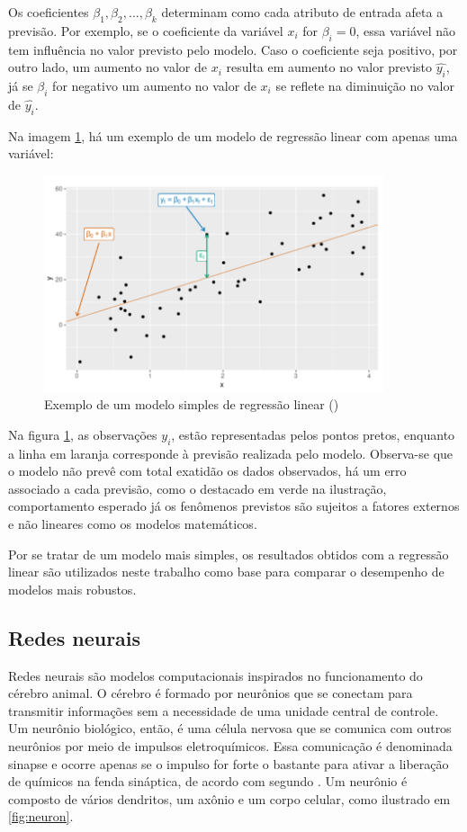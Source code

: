 Os coeficientes $\beta_1, \beta_2, \dots, \beta_k$ 
determinam como cada atributo de entrada afeta a previsão.
Por exemplo, se o coeficiente da variável $x_i$ for $\beta_i = 0$,
essa variável não tem influência no valor previsto pelo modelo. 
Caso o coeficiente seja positivo, por outro lado, um aumento 
no valor de $x_i$ resulta em aumento no valor previsto $\hat{y_i}$,
já se $\beta_i$ for negativo um aumento no valor de $x_i$ se reflete na 
diminuição no valor de $\hat{y_i}$. 


Na imagem \ref{fig:reg_lin}, há um exemplo de um modelo de regressão 
linear com apenas uma variável:

\begin{figure}[H] 
  \includegraphics[width= 10cm]{../figuras/reg_lin.png}
  \caption{Exemplo de um modelo simples de regressão linear
  (\cite{forecasting})}
  \label{fig:reg_lin}
\end{figure}

Na  figura \ref{fig:reg_lin}, as observações $y_i$, estão 
representadas pelos pontos pretos, enquanto a linha em laranja
corresponde à previsão realizada pelo modelo. Observa-se que
o modelo não prevê com total exatidão os dados observados, há 
um erro associado a cada previsão, como o destacado em verde 
na ilustração, comportamento esperado já os fenômenos previstos são 
sujeitos a fatores externos e não lineares como os modelos matemáticos.


Por se tratar de um modelo mais simples, os resultados obtidos
com a regressão linear são utilizados neste trabalho como base 
para comparar o desempenho de modelos mais robustos.

\subsection{Redes neurais}

Redes neurais são modelos computacionais inspirados no funcionamento
do cérebro animal. O cérebro é formado por neurônios que se
conectam para transmitir informações sem a necessidade de 
uma unidade central de controle. Um neurônio biológico, então, 
é uma célula nervosa que se comunica com outros neurônios 
por meio de impulsos eletroquímicos. Essa comunicação é 
denominada sinapse e ocorre apenas se o impulso 
for forte o bastante para ativar a liberação de
químicos na fenda sináptica, de acordo com segundo \cite{deeplearningbook}. 
Um neurônio é composto de vários dendritos, 
um axônio e um corpo celular, como ilustrado em \ref{fig:neuron}. 

